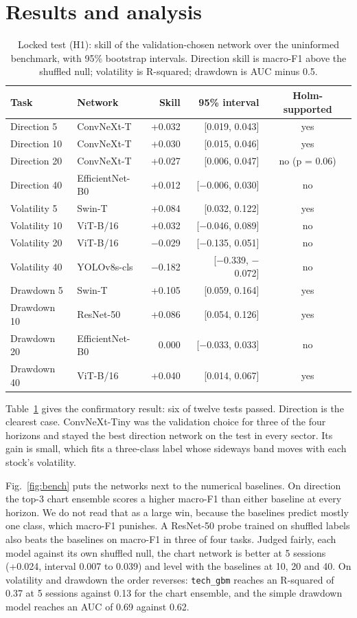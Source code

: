 \documentclass[11pt,a4paper]{article}
\begin{document}
\section{Results and analysis}
\label{sec:results}

\begin{table}[h]
\centering
\caption{Locked test (H1): skill of the validation-chosen network over the uninformed benchmark, with 95\% bootstrap intervals. Direction skill is macro-F1 above the shuffled null; volatility is R-squared; drawdown is AUC minus 0.5.}
\label{tab:h1}
\begin{tabular}{llrrc}
\toprule
Task & Network & Skill & 95\% interval & Holm-supported \\
\midrule
Direction 5 & ConvNeXt-T & +0.032 & [0.019, 0.043] & yes \\
Direction 10 & ConvNeXt-T & +0.030 & [0.015, 0.046] & yes \\
Direction 20 & ConvNeXt-T & +0.027 & [0.006, 0.047] & no (p = 0.06) \\
Direction 40 & EfficientNet-B0 & +0.012 & [$-$0.006, 0.030] & no \\
Volatility 5 & Swin-T & +0.084 & [0.032, 0.122] & yes \\
Volatility 10 & ViT-B/16 & +0.032 & [$-$0.046, 0.089] & no \\
Volatility 20 & ViT-B/16 & $-$0.029 & [$-$0.135, 0.051] & no \\
Volatility 40 & YOLOv8s-cls & $-$0.182 & [$-$0.339, $-$0.072] & no \\
Drawdown 5 & Swin-T & +0.105 & [0.059, 0.164] & yes \\
Drawdown 10 & ResNet-50 & +0.086 & [0.054, 0.126] & yes \\
Drawdown 20 & EfficientNet-B0 & 0.000 & [$-$0.033, 0.033] & no \\
Drawdown 40 & ViT-B/16 & +0.040 & [0.014, 0.067] & yes \\
\bottomrule
\end{tabular}
\end{table}

Table~\ref{tab:h1} gives the confirmatory result: six of twelve tests passed. Direction is the clearest case. ConvNeXt-Tiny was the validation choice for three of the four horizons and stayed the best direction network on the test in every sector. Its gain is small, which fits a three-class label whose sideways band moves with each stock's volatility.

Fig.~\ref{fig:bench} puts the networks next to the numerical baselines. On direction the top-3 chart ensemble scores a higher macro-F1 than either baseline at every horizon. We do not read that as a large win, because the baselines predict mostly one class, which macro-F1 punishes. A ResNet-50 probe trained on shuffled labels also beats the baselines on macro-F1 in three of four tasks. Judged fairly, each model against its own shuffled null, the chart network is better at 5 sessions (+0.024, interval 0.007 to 0.039) and level with the baselines at 10, 20 and 40. On volatility and drawdown the order reverses: \texttt{tech\_gbm} reaches an R-squared of 0.37 at 5 sessions against 0.13 for the chart ensemble, and the simple drawdown model reaches an AUC of 0.69 against 0.62.
\end{document}
